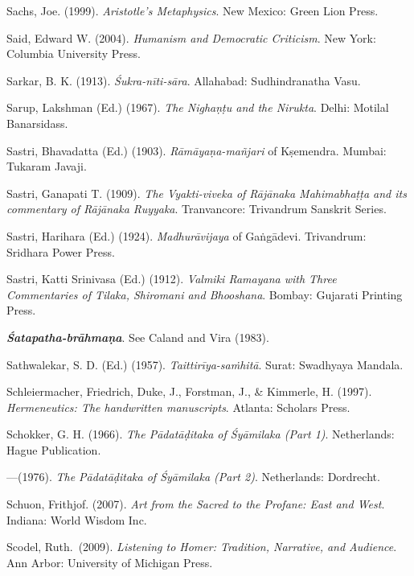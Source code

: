 \begin{thebibliography}{99}
Sachs, Joe. (1999). {\sl Aristotle’s Metaphysics}. New Mexico: Green Lion Press. 

Said, Edward W. (2004).  {\sl Humanism and Democratic Criticism}. New York: Columbia University Press. 

Sarkar, B. K. (1913). {\sl Śukra-nīti-sāra}. Allahabad: Sudhindranatha Vasu. 

Sarup, Lakshman (Ed.) (1967). {\sl The Nighaṇṭu and the Nirukta}. Delhi: Motilal Banarsidass.

Sastri, Bhavadatta (Ed.) (1903). {\sl Rāmāyaṇa-mañjari} of Kṣemendra. Mumbai: Tukaram Javaji. 

Sastri, Ganapati T. (1909). {\sl The Vyakti-viveka of Rājānaka Mahimabhaṭṭa and its commentary of Rājānaka Ruyyaka}. Tranvancore: Trivandrum Sanskrit Series. 

Sastri, Harihara (Ed.) (1924). {\sl Madhurāvijaya} of Gaṅgādevi. Trivandrum: Sridhara Power Press. 

Sastri, Katti Srinivasa (Ed.) (1912). {\sl Valmiki Ramayana with Three Commentaries of Tilaka, Shiromani and Bhooshana}. Bombay: Gujarati Printing Press.

{\sl\bfseries Śatapatha-brāhmaṇa}. See Caland and Vira (1983).

Sathwalekar, S. D. (Ed.) (1957). {\sl Taittirīya-saṁhitā}. Surat: Swadhyaya Mandala.

Schleiermacher, Friedrich, Duke, J., Forstman, J., \& Kimmerle, H. (1997). {\sl Hermeneutics: The handwritten manuscripts}. Atlanta: Scholars Press.  

Schokker, G. H. (1966). {\sl The Pādatāḍitaka of Śyāmilaka (Part 1)}. Netherlands: Hague Publication. 

---\kern3pt(1976). {\sl The Pādatāḍitaka of Śyāmilaka (Part 2)}. Netherlands: Dordrecht. 

Schuon, Frithjof. (2007). {\sl Art from the Sacred to the Profane: East and West}. Indiana: World Wisdom Inc. 

Scodel, Ruth.\ (2009). {\sl Listening to Homer: Tradition, Narrative, and Audience}. Ann Arbor: University of Michigan Press. 


\end{thebibliography}

